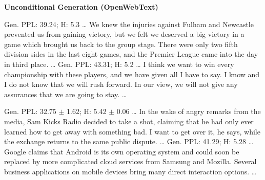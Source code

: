 \begin{tcolorbox}[
    enhanced,
    breakable,
    colframe=owtgreen,
    colback=green!3!white,
    boxrule=0.65pt,
    arc=4pt,
    left=5pt,
    right=5pt,
    top=3pt,
    bottom=3pt,
    width=\textwidth,
    before upper={\setlength{\parindent}{0pt}}]
\noindent
\begin{minipage}[c]{0.04\linewidth}
\centering
\qualpenicon
\end{minipage}%
\begin{minipage}[c]{0.94\linewidth}
{\normalsize\bfseries\textcolor{owtgreen}{Unconditional Generation (OpenWebText)}}
\end{minipage}

{\textcolor{owtgreen}{Gen. PPL:} 39.24; \textcolor{owtgreen}{H:} 5.3}
{\ldots{} We knew the injuries against Fulham and Newcastle prevented us from gaining victory, but we felt we deserved a big victory in a game which brought us back to the group stage. There were only two fifth division sides in the last eight games, and the Premier League came into the day in third place. \ldots{}}
\qualrowsep
{}
{\textcolor{owtgreen}{Gen. PPL:} 43.31; \textcolor{owtgreen}{H:} 5.2}
{\ldots{} I think we want to win every championship with these players, and we have given all I have to say. I know and I do not know that we will rush forward. In our view, we will not give any assurances that we are going to stay. \ldots{}}

{\textcolor{owtgreen}{Gen. PPL:} 32.75 $\pm$ 1.62; \textcolor{owtgreen}{H:} 5.42 $\pm$ 0.06}
{\ldots{} In the wake of angry remarks from the media, Sam Kicks Radio decided to take a shot, claiming that he had only ever learned how to get away with something bad. I want to get over it, he says, while the exchange returns to the same public dispute. \ldots{}}
\qualrowsep
{}
{\textcolor{owtgreen}{Gen. PPL:} 41.29; \textcolor{owtgreen}{H:} 5.28}
{\ldots{} Google claims that Android is its own operating system and could soon be replaced by more complicated cloud services from Samsung and Mozilla. Several business applications on mobile devices bring many direct interaction options. \ldots{}}


\end{tcolorbox}
